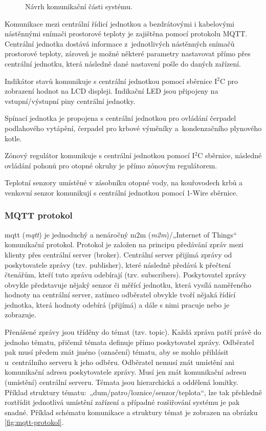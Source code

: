\begin{figure}[H]
    \centering
    \def\svgwidth{\columnwidth}
    
    \caption{Návrh komunikační části systému.}
    \label{fig:navrh-softwarove-casti}
\end{figure}

Komunikace mezi centrální řídicí jednotkou a bezdrátovými i kabelovými nástěnnými snímači prostorové teploty je zajištěna pomocí protokolu MQTT. Centrální jednotka dostává informace z~jednotlivých nástěnných snímačů prostorové teploty, zároveň je možné některé parametry nastavovat přímo přes centrální jednotku, která následně dané nastavení pošle do daných zařízení.

Indikátor stavů komunikuje s centrální jednotkou pomocí sběrnice I$^2$C pro zobrazení hodnot na LCD displeji. Indikační LED jsou připojeny  na vstupní/výstupní piny centrální jednotky.

Spínací jednotka je propojena s centrální jednotkou pro ovládání čerpadel podlahového vytápění, čerpadel pro krbové výměníky a~kondenzačního plynového kotle.

Zónový regulátor komunikuje s centrální jednotkou pomocí I$^2$C sběrnice, následné ovládání pohonů pro otopné okruhy je přímo zónovým regulátorem.

Teplotní senzory umístěné v zásobníku otopné vody, na kouřovodech krbů a venkovní senzor komunikují s centrální jednotkou pomocí 1-Wire sběrnice.



\subsubsection{MQTT protokol}
\label{sec:mqtt-protokol}

\acrshort{mqtt} \cite{mqtt-specifikace} (\textit{\acrlong{mqtt}}) je jednoduchý a nenáročný \acrshort{m2m} (\textit{\acrlong{m2m}})/„Internet of Things“ komunikační protokol. Protokol je založen na principu předávání zpráv mezi klienty přes centrální server (broker). Centrální server přijímá zprávy od poskytovatele zprávy (tzv. publisher), které následně předává k přečtení čtenářům, kteří tuto zprávu odebírají (tzv. subscribers). Poskytovatel zprávy obvykle představuje nějaký senzor či měřící jednotku, která vysílá naměřeného hodnoty na centrální server, zatímco odběratel obvykle tvoří nějaká řídící jednotka, která hodnoty odebírá (přijímá) a dále s nimi pracuje nebo je zobrazuje. \cite{vojacek-mqtt}

Přenášené zprávy jsou tříděny do témat (tzv. topic). Každá zpráva patří právě do jednoho tématu, přičemž témata definuje přímo poskytovatel zprávy. Odběratel pak musí předem znát jméno (označení) tématu, aby se mohlo přihlásit u~centrálního serveru k jeho odběru. Odběratel nemusí znát umístění ani komunikační adresu poskytovatele zprávy. Musí jen znát komunikační adresu (umístění) centrální serveru. Témata jsou hierarchická a oddělená lomítky. Příklad struktury tématu:~„dum/patro/loznice/senzor/teplota“, lze tak přehledně roztřídit jednotlivá umístění zařízení a případné rozšiřování systému je pak snadné. Příklad schématu komunikace a struktury témat je zobrazen na obrázku \ref{fig:mqtt-protokol}. \cite{vojacek-mqtt}
\setnowidow[2]

